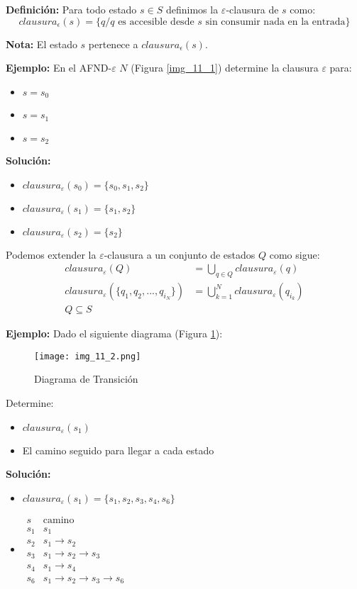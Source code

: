 \textbf{Definición: }Para todo estado $s\in S$ definimos la $\varepsilon$-clausura de $s$ como:
$$clausura_\epsilon(s)=\{ q/q \mbox{ es accesible desde }s\mbox{ sin consumir nada en la entrada} \}$$

\textbf{Nota: }El estado $s$ pertenece a $clausura_\epsilon(s)$.

\textbf{Ejemplo: }En el AFND-$\varepsilon$ $N$ (Figura \ref{img_11_1}) determine la clausura $\varepsilon$ para:

\begin{itemize}
\item $s=s_0$
\item $s=s_1$
\item $s=s_2$
\end{itemize}
\textbf{Solución: }
\begin{itemize}
\item $clausura_\varepsilon(s_0)=\{s_0,s_1,s_2\}$
\item $clausura_\varepsilon(s_1)=\{s_1,s_2\}$
\item $clausura_\varepsilon(s_2)=\{s_2\}$
\end{itemize}

Podemos extender la $\varepsilon$-clausura a un conjunto de estados $Q$ como sigue:
\begin{align*}
clausura_\varepsilon(Q)&=\bigcup_{q\in Q}clausura_\varepsilon(q)\\
clausura_\varepsilon(\{q_1,q_2,...,q_{i_N}\})&= \bigcup_{k=1}^N clausura_\varepsilon(q_{i_k})\\
Q\subseteq S
\end{align*}

\textbf{Ejemplo: }Dado el siguiente diagrama (Figura \ref{img_11_2}):

\begin{figure}[h!]
\centering
\texttt{[image: img\_11\_2.png]}
\caption{Diagrama de Transición} \label{img_11_2}
\end{figure}
Determine:
\begin{itemize}
\item $clausura_\varepsilon(s_1)$
\item El camino seguido para llegar a cada estado
\end{itemize}
\textbf{Solución: }
\begin{itemize}
\item $clausura_\varepsilon(s_1)=\{s_1,s_2,s_3,s_4,s_6\}$
\item
$\begin{array}{c|c}
s	&\mbox{camino}	\\ \hline
s_1	&s_1	\\
s_2	&s_1\rightarrow s_2	\\
s_3	&s_1\rightarrow s_2\rightarrow s_3	\\
s_4	&s_1\rightarrow s_4	\\
s_6	&s_1\rightarrow s_2\rightarrow s_3\rightarrow s_6
\end{array}$
\end{itemize}

